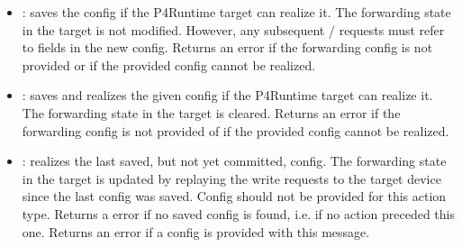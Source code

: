 \documentclass[11pt]{article}
\begin{document}
{\begin{itemize}
\item{}
: saves the config if the P4Runtime target can realize
it. The forwarding state in the target is not modified. However, any
subsequent  /  requests must refer to fields in the new
config. Returns an  error if the forwarding config is not
provided or if the provided config cannot be realized.%

\item{}
: saves and realizes the given config if the P4Runtime
target can realize it. The forwarding state in the target is cleared. Returns
an  error if the forwarding config is not provided of if the
provided config cannot be realized.%

\item{}
: realizes the last saved, but not yet committed, config. The
forwarding state in the target is updated by replaying the write requests to
the target device since the last config was saved. Config should not be
provided for this action type. Returns a  error if no saved config
is found, i.e. if no  action preceded this one. Returns an
 error if a config is provided with this message.%


\end{itemize}}
\end{document}
